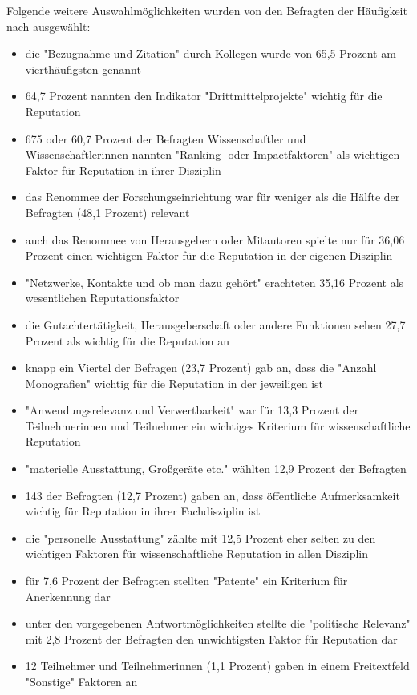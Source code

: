 Folgende weitere Auswahlmöglichkeiten wurden von den Befragten der Häufigkeit nach ausgewählt:
\begin{itemize}
\item die "Bezugnahme und Zitation" durch Kollegen wurde von 65,5 Prozent am vierthäufigsten genannt
\item 64,7 Prozent nannten den Indikator "Drittmittelprojekte" wichtig für die Reputation
\item 675 oder 60,7 Prozent der Befragten Wissenschaftler und Wissenschaftlerinnen nannten "Ranking- oder Impactfaktoren" als wichtigen Faktor für Reputation in ihrer Disziplin
\item das Renommee der Forschungseinrichtung war für weniger als die Hälfte der Befragten (48,1 Prozent) relevant
\item auch das Renommee von Herausgebern oder Mitautoren spielte nur für 36,06 Prozent einen wichtigen Faktor für die Reputation in der eigenen Disziplin
\item "Netzwerke, Kontakte und ob man dazu gehört" erachteten 35,16 Prozent als wesentlichen Reputationsfaktor
\item die Gutachtertätigkeit, Herausgeberschaft oder andere Funktionen sehen 27,7 Prozent als wichtig für die Reputation an
\item knapp ein Viertel der Befragen (23,7 Prozent) gab an, dass die "Anzahl Monografien" wichtig für die Reputation in der jeweiligen ist
\item "Anwendungsrelevanz und Verwertbarkeit" war für 13,3 Prozent der Teilnehmerinnen und Teilnehmer ein wichtiges Kriterium für wissenschaftliche Reputation
\item "materielle Ausstattung, Großgeräte etc." wählten 12,9 Prozent der Befragten
\item 143 der Befragten (12,7 Prozent) gaben an, dass öffentliche Aufmerksamkeit wichtig für Reputation in ihrer Fachdisziplin ist
\item die "personelle Ausstattung" zählte mit 12,5 Prozent eher selten zu den wichtigen Faktoren für wissenschaftliche Reputation in allen Disziplin
\item für 7,6 Prozent der Befragten stellten "Patente" ein Kriterium für Anerkennung dar
\item unter den vorgegebenen Antwortmöglichkeiten stellte die "politische Relevanz" mit 2,8 Prozent der Befragten den unwichtigsten Faktor für Reputation dar
\item 12 Teilnehmer und Teilnehmerinnen (1,1 Prozent) gaben in einem Freitextfeld "Sonstige" Faktoren an
\end{itemize}

